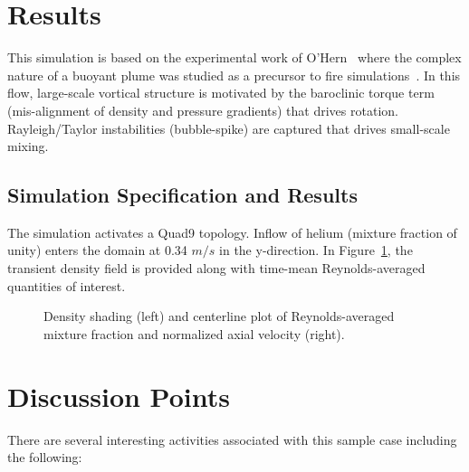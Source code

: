 \documentclass{article}
\begin{document}
\section{Results}
This simulation is based on the experimental work of O'Hern~\cite{ohern2005} 
where the complex nature of a buoyant plume was studied as a precursor to 
fire simulations~\cite{dominoPoF2021}. In this flow, large-scale vortical 
structure is motivated by the baroclinic torque term (mis-alignment of 
density and pressure gradients) that drives rotation. Rayleigh/Taylor 
instabilities (bubble-spike) are captured that drives small-scale mixing. 

\subsection{Simulation Specification and Results}
The simulation activates a Quad9 topology. Inflow of helium (mixture 
fraction of unity) enters the domain at 0.34 $m/s$ in the y-direction. 
In Figure~\ref{fig:results}, the transient density field is provided
along with time-mean Reynolds-averaged quantities of interest.

\begin{figure}[!htbp]
  \centering
  \caption{Density shading (left) and centerline plot of Reynolds-averaged 
mixture fraction and normalized axial velocity (right).}
  \label{fig:results}
\end{figure}

\section{Discussion Points}

There are several interesting activities associated with this sample case 
including the following:
\end{document}
